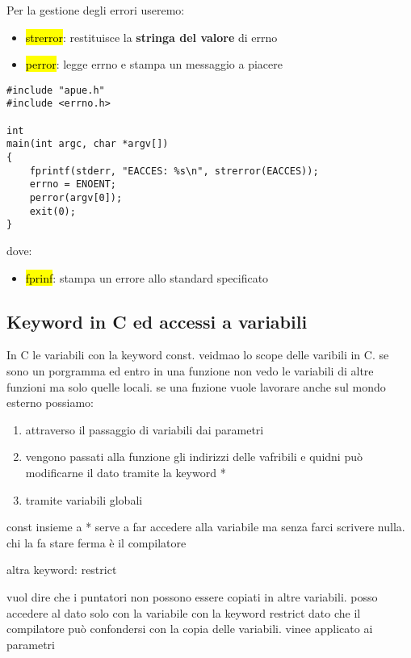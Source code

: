 Per la gestione degli errori useremo:

\begin{itemize}
	\item \hl{strerror}: restituisce la \textbf{stringa del valore} di errno
	\item \hl{perror}: legge errno e stampa un messaggio a piacere
\end{itemize}


\begin{lstlisting}
#include "apue.h"
#include <errno.h>

int
main(int argc, char *argv[])
{
	fprintf(stderr, "EACCES: %s\n", strerror(EACCES));
	errno = ENOENT;
	perror(argv[0]);
	exit(0);
}
\end{lstlisting}


dove:

\begin{itemize}
	\item \hl{fprinf}: stampa un errore allo standard specificato
\end{itemize}


\subsection{Keyword in C ed accessi a variabili}

In C le variabili con la keyword const. 
veidmao lo scope delle varibili in C. se sono un porgramma ed entro in una funzione non vedo le variabili di altre funzioni ma solo quelle locali. se una fnzione vuole lavorare anche sul mondo esterno possiamo:

\begin{enumerate}
	\item attraverso il passaggio di variabili dai parametri
	\item vengono passati alla funzione gli indirizzi delle vafribili e quidni può modificarne il dato tramite la keyword *
	\item tramite variabili globali
\end{enumerate}

const insieme a * serve a far accedere alla variabile ma senza farci scrivere nulla. chi la fa stare ferma è il compilatore 

altra keyword: restrict

vuol dire che i puntatori non possono essere copiati in altre variabili. posso accedere al dato solo con la variabile con la keyword restrict dato che il compilatore può confondersi con la copia delle variabili. vinee applicato ai parametri



